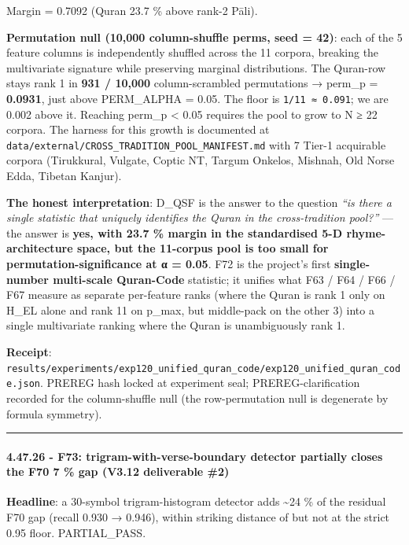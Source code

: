 \documentclass[
]{article}
\begin{document}
Margin = 0.7092 (Quran 23.7 \% above rank-2 Pāli).

\textbf{Permutation null (10,000 column-shuffle perms, seed = 42)}: each
of the 5 feature columns is independently shuffled across the 11
corpora, breaking the multivariate signature while preserving marginal
distributions. The Quran-row stays rank 1 in \textbf{931 / 10,000}
column-scrambled permutations → perm\_p = \textbf{0.0931}, just above
PERM\_ALPHA = 0.05. The floor is \texttt{1/11\ ≈\ 0.091}; we are 0.002
above it. Reaching perm\_p \textless{} 0.05 requires the pool to grow to
N ≥ 22 corpora. The harness for this growth is documented at
\texttt{data/external/CROSS\_TRADITION\_POOL\_MANIFEST.md} with 7 Tier-1
acquirable corpora (Tirukkural, Vulgate, Coptic NT, Targum Onkelos,
Mishnah, Old Norse Edda, Tibetan Kanjur).

\textbf{The honest interpretation}: D\_QSF is the answer to the question
\emph{``is there a single statistic that uniquely identifies the Quran
in the cross-tradition pool?''} --- the answer is \textbf{yes, with 23.7
\% margin in the standardised 5-D rhyme-architecture space, but the
11-corpus pool is too small for permutation-significance at α = 0.05}.
F72 is the project's first \textbf{single-number multi-scale Quran-Code}
statistic; it unifies what F63 / F64 / F66 / F67 measure as separate
per-feature ranks (where the Quran is rank 1 only on H\_EL alone and
rank 11 on p\_max, but middle-pack on the other 3) into a single
multivariate ranking where the Quran is unambiguously rank 1.

\textbf{Receipt}:
\texttt{results/experiments/exp120\_unified\_quran\_code/exp120\_unified\_quran\_code.json}.
PREREG hash locked at experiment seal; PREREG-clarification recorded for
the column-shuffle null (the row-permutation null is degenerate by
formula symmetry).

\begin{center}\rule{0.5\linewidth}{0.5pt}\end{center}

\paragraph{4.47.26 - F73: trigram-with-verse-boundary detector partially
closes the F70 7 \% gap (V3.12 deliverable
\#2)}\label{f73-trigram-with-verse-boundary-detector-partially-closes-the-f70-7-gap-v3.12-deliverable-2}

\textbf{Headline}: a 30-symbol trigram-histogram detector adds
\textasciitilde24 \% of the residual F70 gap (recall 0.930 → 0.946),
within striking distance of but not at the strict 0.95 floor.
PARTIAL\_PASS.
\end{document}
